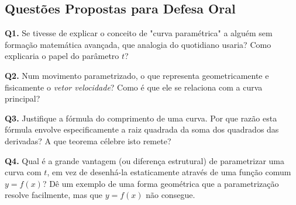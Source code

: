 \subsection{Questões Propostas para Defesa Oral}

\begin{oralbox}
  \textbf{Q1.} Se tivesse de explicar o conceito de "curva paramétrica" a alguém sem formação matemática avançada, que analogia do quotidiano usaria? Como explicaria o papel do parâmetro $t$?
\end{oralbox}

\begin{oralbox}
  \textbf{Q2.} Num movimento parametrizado, o que representa geometricamente e fisicamente o \emph{vetor velocidade}? Como é que ele se relaciona com a curva principal?
\end{oralbox}

\begin{oralbox}
  \textbf{Q3.} Justifique a fórmula do comprimento de uma curva. Por que razão esta fórmula envolve especificamente a raiz quadrada da soma dos quadrados das derivadas? A que teorema célebre isto remete?
\end{oralbox}

\begin{oralbox}
  \textbf{Q4.} Qual é a grande vantagem (ou diferença estrutural) de parametrizar uma curva com $t$, em vez de desenhá-la estaticamente através de uma função comum $y = f(x)$? Dê um exemplo de uma forma geométrica que a parametrização resolve facilmente, mas que $y=f(x)$ não consegue.
\end{oralbox}
